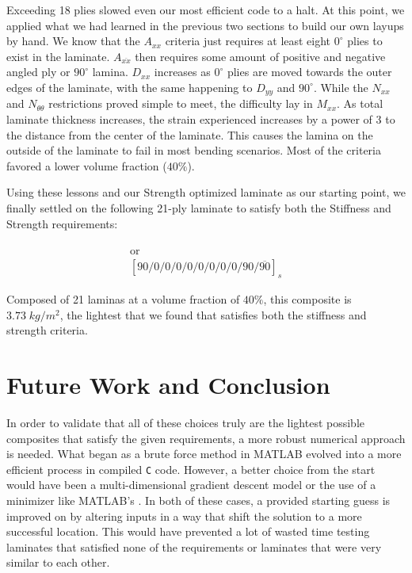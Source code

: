 \documentclass[12pt]{article}
\begin{document}
Exceeding 18 plies slowed even our most efficient code to a halt. At this point, we applied what we had learned in the previous two sections to build our own layups by hand. We know that the $A_{xx}$ criteria just requires at least eight $0 ^\circ$ plies to exist in the laminate. $A_{\overline{xx}} $ then requires some amount of positive and negative angled ply or $90 ^\circ$ lamina. $D_{xx}$ increases as $0 ^\circ$ plies are moved towards the outer edges of the laminate, with the same happening to $D_{yy}$ and $90 ^\circ$. While the $N_{xx}$ and $N_{\theta \theta}$ restrictions proved simple to meet, the difficulty lay in $M_{xx}$. As total laminate thickness increases, the strain experienced increases by a power of 3 to the distance from the center of the laminate. This causes the lamina on the outside of the laminate to fail in most bending scenarios. Most of the criteria favored a lower volume fraction ($40 \%$).

Using these lessons and our Strength optimized laminate as our starting point, we finally settled on the following 21-ply laminate to satisfy both the Stiffness and Strength requirements:

\begin{gather*}
        [90/ 0 /0 /0/ 0/ 0/ 0/ 0/ 0/ 90/ 90/ 90/ 0/ 0/ 0/ 0/ 0/ 0/ 0/ 0/ 90] \\
        \text{or} \\
        [90/ 0 /0 /0/ 0/ 0/ 0/ 0/ 0/ 90/ \overline{90}]_s
        \label{eq:21ply} 
\end{gather*}

\begin{framed}

Composed of 21 laminas at a volume fraction of $40 \%$, this composite is $3.73 \; kg/m^2$, the lightest that we found that satisfies both the stiffness and strength criteria.

\end{framed}

\section{Future Work and Conclusion}




In order to validate that all of these choices truly are the lightest possible composites that satisfy the given requirements, a more robust numerical approach is needed. What began as a brute force method in MATLAB evolved into a more efficient process in compiled \texttt{C} code. However, a better choice from the start would have been a multi-dimensional gradient descent model or the use of a minimizer like MATLAB's . In both of these cases, a provided starting guess is improved on by altering inputs in a way that shift the solution to a more successful location. This would have prevented a lot of wasted time testing laminates that satisfied none of the requirements or laminates that were very similar to each other.
\end{document}

